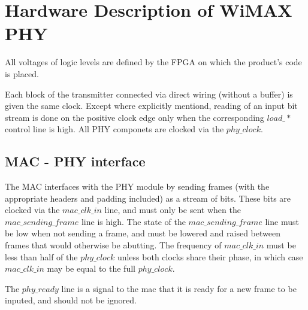 \documentclass[10pt]{article}
\begin{document}

\section{Hardware Description of WiMAX PHY}
All voltages of logic levels are defined by the FPGA on which the product's
code is placed.

Each block of the transmitter connected via direct wiring (without a buffer)
is given the same clock. Except where explicitly mentiond, reading of an input
bit stream is done on the positive clock edge only when the corresponding
$load\_*$ control line is high. All PHY componets are clocked via the
$phy\_clock$.

	\subsection{MAC - PHY interface}
	\label{sec:mac_phy}
	The MAC interfaces with the PHY module by sending frames (with the
	appropriate headers and padding included) as a stream of bits. These
	bits are clocked via the $mac\_clk\_in$ line, and must only be sent
	when the $mac\_sending\_frame$ line is high. The state of the
	$mac\_sending\_frame$ line must be low when not sending a frame, and
	must be lowered and raised between frames that would otherwise be
	abutting. The frequency of $mac\_clk\_in$ must be less than
	half of the $phy\_clock$ unless both clocks share their phase, in
	which case $mac\_clk\_in$ may be equal to the full $phy\_clock$.

	The $phy\_ready$ line is a signal to the mac that it is ready for a
	new frame to be inputed, and should not be ignored.
\end{document}
